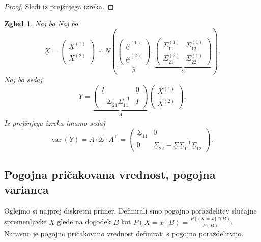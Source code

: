 \documentclass[10pt, a4paper]{article}
\newtheorem{zgled}[izr]{Zgled}
\newenvironment{noticeC}{%
  \tcolorbox[%
  notitle,
  empty,
  enhanced,  %
  breakable,
  coltext=black, 
  fontupper=\rmfamily,
  parbox=false,
  noparskip,
  sharp corners,
  boxrule=-1pt,  %
  frame hidden,
  left=7pt,  %
  right=7pt,
  top=5pt,
  bottom=5pt,
  before skip=2.5ex plus 2pt,
  after skip=2.5ex plus 2pt,
  overlay unbroken and last={%
  },
  ]}
{\endtcolorbox}
\newenvironment{dokaz}%
  {\begin{noticeC}\begin{proof}}%
  {\end{proof}\end{noticeC}}
\newcommand{\vari}{\mathrm{var}\,}
\begin{document}
\begin{dokaz}
  Sledi iz prejšnjega izreka.
\end{dokaz}

\begin{zgled}
  Naj bo Naj bo $$\underline{X} = \begin{pmatrix}
    \underline{X}^{(1)}\\
    \underline{X}^{(2)}
  \end{pmatrix} \sim N\left(\underbrace{\begin{pmatrix}
    \underline{\mu}^{(1)}\\
    \underline{\mu}^{(2)}
  \end{pmatrix}}_{\underline{\mu}}, 
  \underbrace{\begin{pmatrix}
    \underline{\Sigma}_{11}^{(1)} & \underline{\Sigma}_{12}^{(1)}\\
    \underline{\Sigma}_{21}^{(2)} & \underline{\Sigma}_{22}^{(1)}
  \end{pmatrix}}_{\underline{\Sigma}}\right).$$
  Naj bo sedaj $$\underline{Y} = \underbrace{\begin{pmatrix}
    \underline{I} & \underline{0}\\
    - \underline{\Sigma}_{21} \underline{\Sigma}_{11}^{-1} & \underline{I} 
  \end{pmatrix}}_{\underline{A}} \begin{pmatrix}
    \underline{X}^{(1)}\\
    \underline{X}^{(2)}
  \end{pmatrix}.$$
  Iz prejšnjega izreka imamo sedaj 
  $$\vari(\underline{Y}) = \underline{A} \cdot \underline{\Sigma} \cdot \underline{A}^\top = \begin{pmatrix}
    \underline{\Sigma}_{11} & 0\\
    0 & \underline{\Sigma}_{22} - \underline{\Sigma} \underline{\Sigma}_{11} ^{-1} \underline{\Sigma}_{12}
  \end{pmatrix}.$$
\end{zgled}

\subsection{Pogojna pričakovana vrednost, pogojna varianca}

Oglejmo si najprej diskretni primer.
Definirali smo pogojno porazdelitev slučajne spremenljivke $X$ glede na dogodek $B$ 
kot $P(X = x\ |\ B) = \frac{P(\{X = x\} \cap B)}{P(B)}$.
Naravno je pogojno pričakovano vrednost definirati s pogojno porazdelitvijo.
\end{document}
